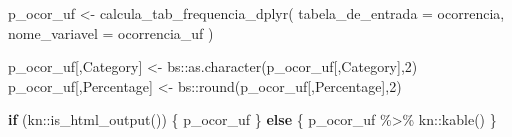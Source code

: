 \documentclass[
]{article}
\newenvironment{Shaded}{\begin{snugshade}}{\end{snugshade}}
\newcommand{\AttributeTok}[1]{\textcolor[rgb]{0.77,0.63,0.00}{#1}}
\newcommand{\ControlFlowTok}[1]{\textcolor[rgb]{0.13,0.29,0.53}{\textbf{#1}}}
\newcommand{\DecValTok}[1]{\textcolor[rgb]{0.00,0.00,0.81}{#1}}
\newcommand{\FunctionTok}[1]{\textcolor[rgb]{0.00,0.00,0.00}{#1}}
\newcommand{\NormalTok}[1]{#1}
\newcommand{\OtherTok}[1]{\textcolor[rgb]{0.56,0.35,0.01}{#1}}
\newcommand{\SpecialCharTok}[1]{\textcolor[rgb]{0.00,0.00,0.00}{#1}}
\newcommand{\StringTok}[1]{\textcolor[rgb]{0.31,0.60,0.02}{#1}}
\begin{document}
\begin{Shaded}
\begin{Highlighting}[]
\NormalTok{p\_ocor\_uf }\OtherTok{\textless{}{-}} \FunctionTok{calcula\_tab\_frequencia\_dplyr}\NormalTok{(}
    \AttributeTok{tabela\_de\_entrada =}\NormalTok{ ocorrencia,}
    \AttributeTok{nome\_variavel =} \StringTok{\textasciigrave{}}\AttributeTok{ocorrencia\_uf}\StringTok{\textasciigrave{}}
\NormalTok{)}

\NormalTok{p\_ocor\_uf[,}\StringTok{\textquotesingle{}Category\textquotesingle{}}\NormalTok{] }\OtherTok{\textless{}{-}}\NormalTok{ bs}\SpecialCharTok{::}\FunctionTok{as.character}\NormalTok{(p\_ocor\_uf[,}\StringTok{\textquotesingle{}Category\textquotesingle{}}\NormalTok{],}\DecValTok{2}\NormalTok{)}
\NormalTok{p\_ocor\_uf[,}\StringTok{\textquotesingle{}Percentage\textquotesingle{}}\NormalTok{] }\OtherTok{\textless{}{-}}\NormalTok{ bs}\SpecialCharTok{::}\FunctionTok{round}\NormalTok{(p\_ocor\_uf[,}\StringTok{\textquotesingle{}Percentage\textquotesingle{}}\NormalTok{],}\DecValTok{2}\NormalTok{)}

\ControlFlowTok{if}\NormalTok{ (kn}\SpecialCharTok{::}\FunctionTok{is\_html\_output}\NormalTok{()) \{}
\NormalTok{    p\_ocor\_uf}
\NormalTok{\} }\ControlFlowTok{else}\NormalTok{ \{}
\NormalTok{    p\_ocor\_uf }\SpecialCharTok{\%\textgreater{}\%}\NormalTok{ kn}\SpecialCharTok{::}\FunctionTok{kable}\NormalTok{()}
\NormalTok{\}}
\end{Highlighting}
\end{Shaded}
\end{document}
